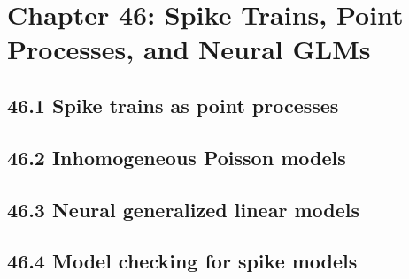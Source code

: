 \section{Chapter 46: Spike Trains, Point Processes, and Neural GLMs}

\subsection{46.1 Spike trains as point processes}

\subsection{46.2 Inhomogeneous Poisson models}

\subsection{46.3 Neural generalized linear models}

\subsection{46.4 Model checking for spike models}

\clearpage
